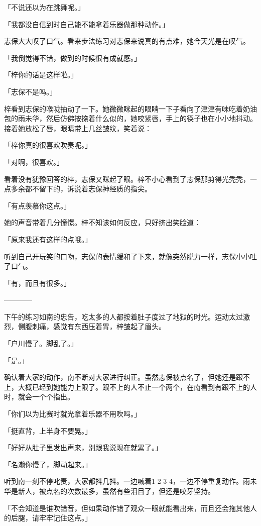 \documentclass[UTF8]{ctexart}
\begin{document}
    「不说还以为在跳舞呢。」

    「我都没自信到时自己能不能拿着乐器做那种动作。」

    志保大大叹了口气。看来步法练习对志保来说真的有点难，她今天光是在叹气。

    「我倒觉得不错，做到的时候很有成就感。」

    「梓你的话是这样啦。」

    「志保不是吗。」

    梓看到志保的喉咙抽动了一下。她微微眯起的眼睛一下子看向了津津有味吃着奶油包的雨未华，然后仿佛按捺着什么似的，她咬紧唇，手上的筷子也在小小地抖动。接着她放松了唇，眼睛带上几丝皱纹，笑着说：

    「梓你真的很喜欢吹奏呢。」

    「对啊，很喜欢。」

    看着没有犹豫回答的梓，志保又眯起了眼。梓不小心看到了志保那剪得光秃秃，一点多余都不留下的，诉说着志保神经质的指尖。

    「有点羡慕你这点。」

    她的声音带着几分憧憬。梓不知该如何反应，只好挤出笑脸道：

    「原来我还有这样的点哦。」

    听到自己开玩笑的口吻，志保的表情缓和了下来，就像突然脱力一样，志保小小吐了口气。

    「有，而且有很多。」

    ————

    下午的练习如南的忠告，吃太多的人都按着肚子度过了地狱的时光。运动太过激烈，侧腹刺痛，感觉有东西压着胃，梓皱起了眉头。

    「户川慢了。脚乱了。」

    「是。」

    确认着大家的动作，南不断对大家进行纠正。虽然志保被点名了，但她还是跟不上，大概已经到她能力上限了。跟不上的人不止一个两个，在南看到有跟不上的人时，就会一个个指出。

    「你们以为比赛时就光拿着乐器不用吹吗。」

    「挺直背，上半身不要晃。」

    「好好从肚子里发出声来，别跟我说现在就累了。」

    「名濑你慢了，脚动起来。」

    听到南一刻不停叱责，大家都抖几抖。一边喊着1 2 3 4，一边不停重复动作。雨未华是新人，被点名的次数最多，虽然有些泪目了，但还是咬牙坚持。

    「不会知道是谁吹错音，但如果动作错了观众一眼就能看出来，而且还会拖其他人的后腿，请牢牢记住这点。」
\end{document}
